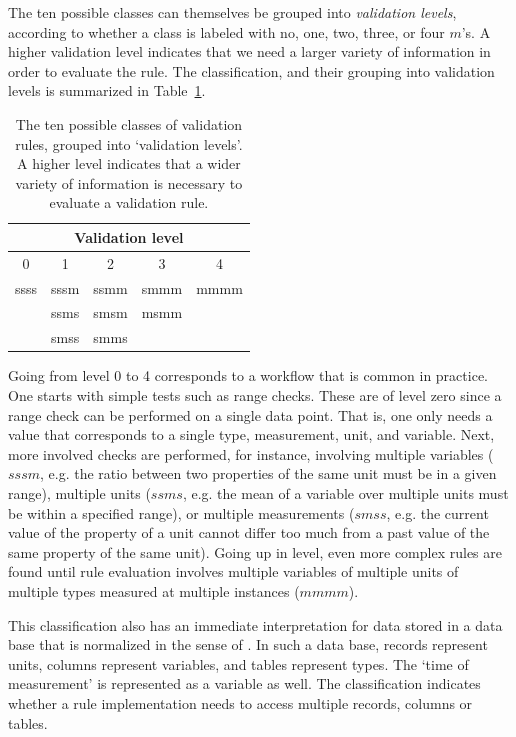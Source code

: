 The ten possible classes can themselves be grouped into \emph{validation levels},
according to whether a class is labeled with no, one, two, three, or four
$m$'s.  A higher validation level indicates that we need a larger variety of
information in order to evaluate the rule. The classification, and their
grouping into validation levels is summarized in Table~\ref{tab:validationlevels}.

\begin{table}[h]
\caption{The ten possible classes of validation rules, grouped into `validation
levels'.  A higher level indicates that a wider variety of information is
necessary to evaluate a validation rule.}
\label{tab:validationlevels}
\centering
\begin{tabular}{@{}ccccc@{}}
\multicolumn{5}{c}{Validation level}\\
\hline
0 & 1 & 2 & 3 & 4\\
\hline
ssss & sssm & ssmm & smmm & mmmm \\
     & ssms & smsm & msmm &      \\
     & smss & smms &      &      \\
\hline
\end{tabular}
\end{table}



%

Going from level 0 to 4 corresponds to a workflow that is common in
practice. One starts with simple tests such as range checks.  These are of
level zero since a range check can be performed on a single data point. That
is, one only needs a value that corresponds to a single type, measurement,
unit, and variable.  Next, more involved checks are performed, for instance,
involving multiple variables ($sssm$, e.g. the ratio between two properties of
the same unit must be in a given range), multiple units ($ssms$, e.g.  the mean of
a variable over multiple units must be within a specified range), or multiple
measurements ($smss$, e.g.  the current value of the property of a unit cannot
differ too much from a past value of the same property of the same unit).
Going up in level, even more complex rules are found until rule evaluation
involves multiple variables of multiple units of multiple types measured at
multiple instances ($mmmm$). 

This classification also has an immediate interpretation for data stored in a
data base that is normalized in the sense of \citet{codd1970relational}. In
such a data base, records represent units, columns represent variables, and tables
represent types. The `time of measurement' is represented as a variable as
well. The classification indicates whether a rule implementation needs to
access multiple records, columns or tables.



